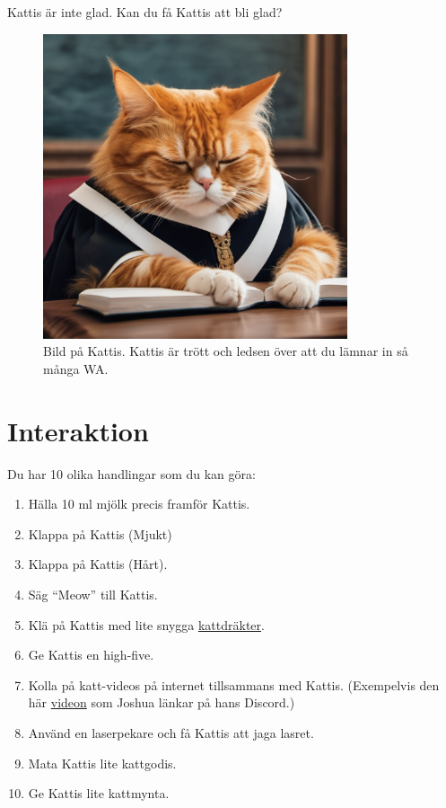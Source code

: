 
Kattis är inte glad. Kan du få Kattis att bli glad?

\begin{centering}
  \begin{figure}[h]
      \centering
      \includegraphics[width=0.8\textwidth]{tired-kattis.png}
      \caption{Bild på Kattis. Kattis är trött och ledsen över att du lämnar in så många WA. }
  \end{figure}
\end{centering}


\section*{Interaktion}
Du har 10 olika handlingar som du kan göra: 

\begin{enumerate}
  \item Hälla 10 ml mjölk precis framför Kattis.
  \item Klappa på Kattis (Mjukt)
  \item Klappa på Kattis (Hårt).
  \item Säg ``Meow'' till Kattis.
  \item Klä på Kattis med lite snygga \href{https://www.amazon.se/kostymer-roliga-husdjur-kattunge-outfits/dp/B08XX7W5F9}{kattdräkter}.
  \item Ge Kattis en high-five.
  \item Kolla på katt-videos på internet tillsammans med Kattis. (Exempelvis den här \href{https://www.youtube.com/watch?v=NAh9oLs67Cw}{videon} som Joshua länkar på hans Discord.)
  \item Använd en laserpekare och få Kattis att jaga lasret. 
  \item Mata Kattis lite kattgodis.
  \item Ge Kattis lite kattmynta.
\end{enumerate}

